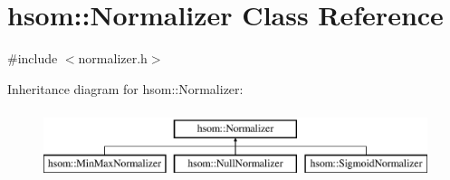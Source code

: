 \hypertarget{classhsom_1_1_normalizer}{\section{hsom\-:\-:\-Normalizer \-Class \-Reference}
\label{classhsom_1_1_normalizer}
}


{\ttfamily \#include $<$normalizer.\-h$>$}

\-Inheritance diagram for hsom\-:\-:\-Normalizer\-:\begin{figure}[H]
\begin{center}
\leavevmode
\includegraphics[height=2.000000cm]{classhsom_1_1_normalizer}
\end{center}
\end{figure}
